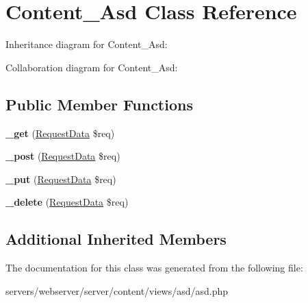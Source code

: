 \hypertarget{class_lora_1_1_content_1_1_content___asd}{}\section{Content\+\_\+\+Asd Class Reference}
\label{class_lora_1_1_content_1_1_content___asd}


Inheritance diagram for Content\+\_\+\+Asd\+:


Collaboration diagram for Content\+\_\+\+Asd\+:
\subsection*{Public Member Functions}
\begin{DoxyCompactItemize}
\item 
\mbox{\label{class_lora_1_1_content_1_1_content___asd_a3ad4bf1b146a3180b34d1327ff2abf69}} 
{\bfseries \+\_\+get} (\hyperlink{class_request_data}{Request\+Data} \$req)
\item 
\mbox{\label{class_lora_1_1_content_1_1_content___asd_a50751d47a139282d1c3b08cab1b6562e}} 
{\bfseries \+\_\+post} (\hyperlink{class_request_data}{Request\+Data} \$req)
\item 
\mbox{\label{class_lora_1_1_content_1_1_content___asd_a2affcc8f31c13147c33450193b229194}} 
{\bfseries \+\_\+put} (\hyperlink{class_request_data}{Request\+Data} \$req)
\item 
\mbox{\label{class_lora_1_1_content_1_1_content___asd_ab8ddc6de1e04524212f7d55893f78864}} 
{\bfseries \+\_\+delete} (\hyperlink{class_request_data}{Request\+Data} \$req)
\end{DoxyCompactItemize}
\subsection*{Additional Inherited Members}


The documentation for this class was generated from the following file\+:\begin{DoxyCompactItemize}
\item 
servers/webserver/server/content/views/asd/asd.\+php\end{DoxyCompactItemize}

